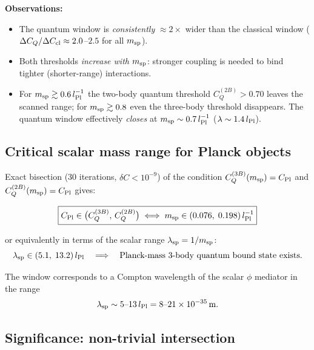 \noindent
\textbf{Observations:}
\begin{itemize}
\item The quantum window is \emph{consistently} $\approx 2\times$ wider
  than the classical window ($\Delta C_Q / \Delta C_{\rm cl} \approx
  2.0$--$2.5$ for all $m_{\rm sp}$).
\item Both thresholds \emph{increase with $m_{\rm sp}$}: stronger coupling
  is needed to bind tighter (shorter-range) interactions.
\item For $m_{\rm sp}\gtrsim 0.6\,l_{\rm Pl}^{-1}$ the two-body
  quantum threshold $C_Q^{(2B)}>0.70$ leaves the scanned range;
  for $m_{\rm sp}\gtrsim 0.8$ even the three-body threshold disappears.
  The quantum window effectively \emph{closes} at $m_{\rm sp}\sim
  0.7\,l_{\rm Pl}^{-1}$ ($\lambda\sim1.4\,l_{\rm Pl}$).
\end{itemize}

\subsection{Critical scalar mass range for Planck objects}

Exact bisection (30 iterations, $\delta C < 10^{-9}$) of the condition
$C_Q^{(3B)}(m_{\rm sp}) = C_{\rm Pl}$ and $C_Q^{(2B)}(m_{\rm sp}) =
C_{\rm Pl}$ gives:

\begin{equation}
\boxed{C_{\rm Pl} \in \bigl(C_Q^{(3B)},\,C_Q^{(2B)}\bigr)
  \;\Longleftrightarrow\;
  m_{\rm sp} \in (0.076,\;0.198)\,l_{\rm Pl}^{-1}}
\label{eq:msp_window}
\end{equation}

or equivalently in terms of the scalar range
$\lambda_{\rm sp} = 1/m_{\rm sp}$:
\begin{equation}
  \lambda_{\rm sp} \in (5.1,\;13.2)\,l_{\rm Pl}
  \quad\Longrightarrow\quad
  \text{Planck-mass 3-body quantum bound state exists.}
\label{eq:lambda_window}
\end{equation}

The window corresponds to a Compton wavelength of the scalar
$\phi$ mediator in the range
\begin{equation}
  \lambda_{\rm sp} \sim 5\text{--}13\,l_{\rm Pl}
  = 8\text{--}21\times10^{-35}\,\text{m}.
\end{equation}

\subsection{Significance: non-trivial intersection}

